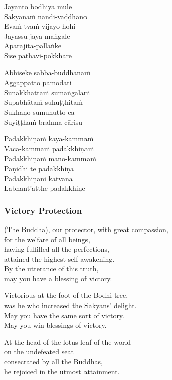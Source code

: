 \begin{paritta}
  Jayanto bodhiyā mūle\\
  Sakyānaṁ nandi-vaḍḍhano\\
  Evaṁ tvaṁ vijayo hohi\\
  Jayassu jaya-maṅgale\\
  Aparājita-pallaṅke\\
  Sīse paṭhavi-pokkhare

  Abhiseke sabba-buddhānaṁ\\
  Aggappatto pamodati\\
  Sunakkhattaṁ sumaṅgalaṁ\\
  Supabhātaṁ suhuṭṭhitaṁ\\
  Sukhaṇo sumuhutto ca\\
  Suyiṭṭhaṁ brahma-cārisu

  Padakkhiṇaṁ kāya-kammaṁ\\
  Vācā-kammaṁ padakkhiṇaṁ\\
  Padakkhiṇaṁ mano-kammaṁ\\
  Paṇidhi te padakkhiṇā\\
  Padakkhiṇāni katvāna\\
  Labhant'atthe padakkhiṇe 
\end{paritta}

\subsubsection{Victory Protection}


(The Buddha), our protector, with great compassion,\\
for the welfare of all beings,\\
having fulfilled all the perfections,\\
attained the highest self-awakening.\\
By the utterance of this truth,\\
may you have a blessing of victory.

Victorious at the foot of the Bodhi tree,\\
was he who increased the Sakyans' delight.\\
May you have the same sort of victory.\\
May you win blessings of victory.

At the head of the lotus leaf of the world\\
on the undefeated seat\\
consecrated by all the Buddhas,\\
he rejoiced in the utmost attainment.


